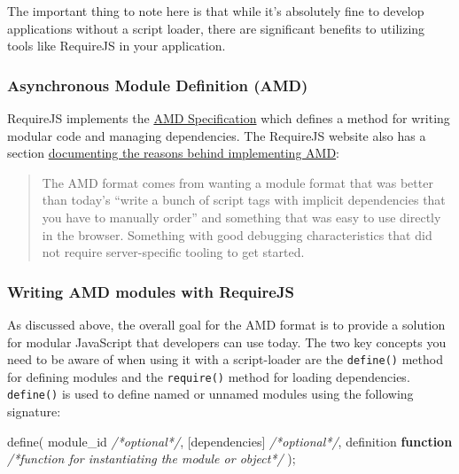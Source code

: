 \documentclass[9pt]{book}
\newenvironment{Shaded}{}{}
\newcommand{\KeywordTok}[1]{\textcolor[rgb]{0.00,0.44,0.13}{\textbf{{#1}}}}
\newcommand{\CommentTok}[1]{\textcolor[rgb]{0.38,0.63,0.69}{\textit{{#1}}}}
\newcommand{\FunctionTok}[1]{\textcolor[rgb]{0.02,0.16,0.49}{{#1}}}
\newcommand{\NormalTok}[1]{{#1}}
\begin{document}
The important thing to note here is that while it's absolutely fine to
develop applications without a script loader, there are significant
benefits to utilizing tools like RequireJS in your application.

\subsubsection{Asynchronous Module Definition
(AMD)}\label{asynchronous-module-definition-amd}

RequireJS implements the
\href{https://github.com/amdjs/amdjs-api/wiki/AMD}{AMD Specification}
which defines a method for writing modular code and managing
dependencies. The RequireJS website also has a section
\href{http://requirejs.org/docs/whyamd.html}{documenting the reasons
behind implementing AMD}:

\begin{quote}
The AMD format comes from wanting a module format that was better than
today's ``write a bunch of script tags with implicit dependencies that
you have to manually order'' and something that was easy to use directly
in the browser. Something with good debugging characteristics that did
not require server-specific tooling to get started.
\end{quote}

\subsubsection{Writing AMD modules with
RequireJS}\label{writing-amd-modules-with-requirejs}

As discussed above, the overall goal for the AMD format is to provide a
solution for modular JavaScript that developers can use today. The two
key concepts you need to be aware of when using it with a script-loader
are the \texttt{define()} method for defining modules and the
\texttt{require()} method for loading dependencies. \texttt{define()} is
used to define named or unnamed modules using the following signature:

\begin{Shaded}
\begin{Highlighting}[]
\FunctionTok{define}\NormalTok{(}
    \NormalTok{module_id }\CommentTok{/*optional*/}\NormalTok{,}
    \NormalTok{[dependencies] }\CommentTok{/*optional*/}\NormalTok{,}
    \NormalTok{definition }\KeywordTok{function} \CommentTok{/*function for instantiating the module or object*/}
\NormalTok{);}
\end{Highlighting}
\end{Shaded}
\end{document}

